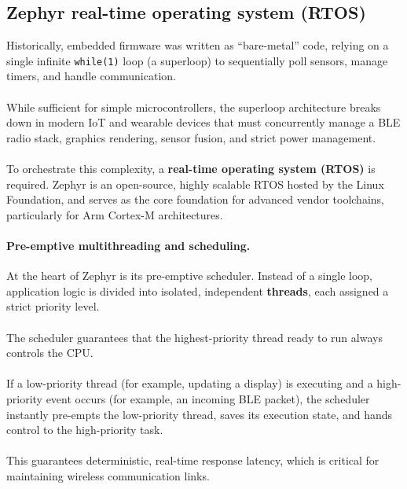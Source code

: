 \documentclass[12pt, a4paper]{article}
\begin{document}
\subsection{Zephyr real-time operating system (RTOS)}
Historically, embedded firmware was written as ``bare-metal'' code, relying on a
single infinite \texttt{while(1)} loop (a superloop) to sequentially poll
sensors, manage timers, and handle communication.\\\\
While sufficient for simple
microcontrollers, the superloop architecture breaks down in modern IoT and
wearable devices that must concurrently manage a BLE radio stack, graphics
rendering, sensor fusion, and strict power management.\\\\
To orchestrate this complexity, a \textbf{real-time operating system (RTOS)} is
required. Zephyr is an open-source, highly scalable RTOS hosted by the Linux
Foundation, and serves as the core foundation for advanced vendor toolchains,
particularly for Arm Cortex-M architectures.

\paragraph{Pre-emptive multithreading and scheduling.}
At the heart of Zephyr is its pre-emptive scheduler. Instead of a single loop,
application logic is divided into isolated, independent \textbf{threads}, each
assigned a strict priority level.\\\\
The scheduler guarantees that the
highest-priority thread ready to run always controls the CPU.\\\\
If a low-priority
thread (for example, updating a display) is executing and a high-priority event
occurs (for example, an incoming BLE packet), the scheduler instantly pre-empts
the low-priority thread, saves its execution state, and hands control to the
high-priority task.\\\\
This guarantees deterministic, real-time response latency,
which is critical for maintaining wireless communication links.
\end{document}
